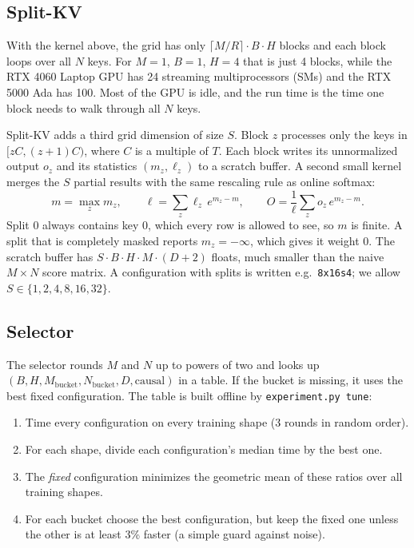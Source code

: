 \documentclass[11pt]{article}
\begin{document}
\subsection{Split-KV}
With the kernel above, the grid has only $\lceil M/R \rceil \cdot B \cdot H$
blocks and each block loops over all $N$ keys. For $M = 1$, $B = 1$, $H = 4$ that
is just 4 blocks, while the RTX 4060 Laptop GPU has 24 streaming
multiprocessors (SMs) and the RTX 5000 Ada has 100. Most of the GPU is idle,
and the run time is the time one block needs to walk through all $N$ keys.

Split-KV adds a third grid dimension of size $S$. Block $z$ processes only the
keys in $[zC, (z+1)C)$, where $C$ is a multiple of $T$. Each block writes its
unnormalized output $o_z$ and its statistics $(m_z, \ell_z)$ to a scratch
buffer. A second small kernel merges the $S$ partial results with the same
rescaling rule as online softmax:
\begin{equation}
  m = \max_z m_z, \qquad
  \ell = \sum_z \ell_z\, e^{m_z - m}, \qquad
  O = \frac{1}{\ell}\sum_z o_z\, e^{m_z - m}.
\end{equation}
Split 0 always contains key 0, which every row is allowed to see, so $m$ is
finite. A split that is completely masked reports $m_z = -\infty$, which gives
it weight $0$. The scratch buffer has $S \cdot B \cdot H \cdot M \cdot (D+2)$
floats, much smaller than the naive $M \times N$ score matrix.
A configuration with splits is written e.g.\ \texttt{8x16s4}; we allow
$S \in \{1, 2, 4, 8, 16, 32\}$.

\subsection{Selector}
The selector rounds $M$ and $N$ up to powers of two and looks up
$(B, H, M_\text{bucket}, N_\text{bucket}, D, \text{causal})$ in a table. If the
bucket is missing, it uses the best fixed configuration. The table is built
offline by \texttt{experiment.py tune}:
\begin{enumerate}
  \item Time every configuration on every training shape (3 rounds in random order).
  \item For each shape, divide each configuration's median time by the best one.
  \item The \emph{fixed} configuration minimizes the geometric mean of these
        ratios over all training shapes.
  \item For each bucket choose the best configuration, but keep the fixed one
        unless the other is at least 3\% faster (a simple guard against noise).
\end{enumerate}
\end{document}
